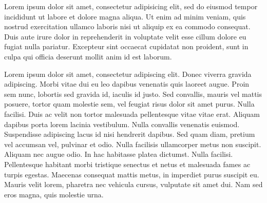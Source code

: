Lorem ipsum dolor sit amet, consectetur adipisicing elit, sed do eiusmod tempor incididunt ut labore et dolore magna aliqua. Ut enim ad minim veniam, quis nostrud exercitation ullamco laboris nisi ut aliquip ex ea commodo consequat. Duis aute irure dolor in reprehenderit in voluptate velit esse cillum dolore eu fugiat nulla pariatur. Excepteur sint occaecat cupidatat non proident, sunt in culpa qui officia deserunt mollit anim id est laborum.

Lorem ipsum dolor sit amet, consectetur adipiscing elit. Donec viverra gravida adipiscing. Morbi vitae dui eu leo dapibus venenatis quis laoreet augue. Proin sem nunc, lobortis sed gravida id, iaculis id justo. Sed convallis, mauris vel mattis posuere, tortor quam molestie sem, vel feugiat risus dolor sit amet purus. Nulla facilisi. Duis ac velit non tortor malesuada pellentesque vitae vitae erat. Aliquam dapibus porta lorem lacinia vestibulum. Nulla convallis venenatis euismod. Suspendisse adipiscing lacus id nisi hendrerit dapibus. Sed quam diam, pretium vel accumsan vel, pulvinar et odio. Nulla facilisis ullamcorper metus non suscipit. Aliquam nec augue odio. In hac habitasse platea dictumst. Nulla facilisi. Pellentesque habitant morbi tristique senectus et netus et malesuada fames ac turpis egestas. Maecenas consequat mattis metus, in imperdiet purus suscipit eu. Mauris velit lorem, pharetra nec vehicula cursus, vulputate sit amet dui. Nam sed eros magna, quis molestie urna.
